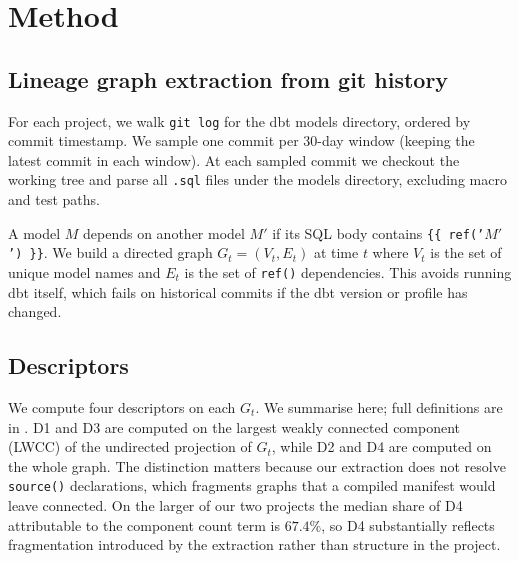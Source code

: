 \documentclass[11pt,a4paper]{article}
\begin{document}
\section{Method}

\subsection{Lineage graph extraction from git history}

For each project, we walk \texttt{git log} for the dbt models
directory, ordered by commit timestamp. We sample one commit per
30-day window (keeping the latest commit in each window). At each
sampled commit we checkout the working tree and parse all
\texttt{.sql} files under the models directory, excluding macro and
test paths.

A model \texttt{$M$} depends on another model \texttt{$M'$} if its
SQL body contains \texttt{\{\{ ref('$M'$') \}\}}. We build a directed
graph $G_t = (V_t, E_t)$ at time $t$ where $V_t$ is the set of
unique model names and $E_t$ is the set of \texttt{ref()} dependencies.
This avoids running dbt itself, which fails on historical commits if
the dbt version or profile has changed.

\subsection{Descriptors}

We compute four descriptors on each $G_t$. We summarise here; full
definitions are in \citep{hari2026descriptors}. D1 and D3 are computed
on the largest weakly connected component (LWCC) of the undirected
projection of $G_t$, while D2 and D4 are computed on the whole graph.
The distinction matters because our extraction does not resolve
\texttt{source()} declarations, which fragments graphs that a compiled
manifest would leave connected. On the larger of our two projects the
median share of D4 attributable to the component count term is
$67.4\%$, so D4 substantially reflects fragmentation introduced by the
extraction rather than structure in the project.
\end{document}
